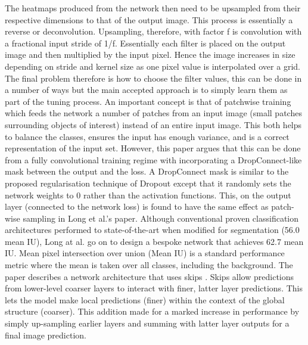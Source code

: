 \documentclass[11pt,twoside]{report}
\begin{document}
The heatmaps produced from the network then need to be upsampled from their respective dimensions to that of the output image. This process is essentially a reverse or deconvolution. Upsampling, therefore, with factor f is convolution with a fractional input stride of 1/f. Essentially each filter is placed on the output image and then multiplied by the input pixel. Hence the image increases in size depending on stride and kernel size as one pixel value is interpolated over a grid. The final problem therefore is how to choose the filter values, this can be done in a number of ways but the main accepted approach is to simply learn them as part of the tuning process.
\newline \newline
An important concept is that of patchwise training which feeds the network a number of patches from an input image (small patches surrounding objects of interest) instead of an entire input image. This both helps to balance the classes, ensures the input has enough variance, and is a correct representation of the input set. However, this paper argues that this can be done from a fully convolutional training regime with incorporating a DropConnect-like mask \cite{Wan:2013:RNN:3042817.3043055} between the output and the loss. A DropConnect mask is similar to the proposed regularisation technique of Dropout \cite{JMLR:v15:srivastava14a} except that it randomly sets the network weights to 0 rather than the activation functions. This, on the output layer (connected to the network loss) is found to have the same effect as patch-wise sampling in Long et al.'s paper.
\newline \newline
Although conventional proven classification architectures performed to state-of-the-art when modified for segmentation (56.0 mean IU), Long at al. \cite{DBLP:journals/corr/LongSD14} go on to design a bespoke network that achieves 62.7 mean IU. Mean pixel intersection over union (Mean IU) is a standard performance metric where the mean is taken over all classes, including the background. The paper describes a network architecture that uses skips \cite{Bishop:2006:PRM:1162264}. Skips allow predictions from lower-level coarser layers to interact with finer, latter layer predictions. This lets the model make local predictions (finer) within the context of the global structure (coarser). This addition made for a marked increase in performance by simply up-sampling earlier layers and summing with latter layer outputs for a final image prediction.
\end{document}

